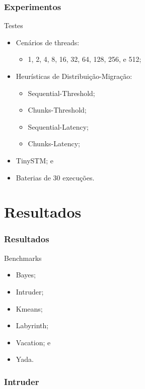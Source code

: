 \documentclass[10pt, pdf,xcolor=pdftex,dvipsnames,table]{beamer}
\begin{document}
\begin{frame} \frametitle{Experimentos}
    \begin{block}{Testes}
        \begin{itemize}
        	\item Cenários de threads: 
            \begin{itemize}
                \item 1, 2, 4, 8, 16, 32, 64, 128, 256, e 512;
            \end{itemize}
            \item Heurísticas de Distribuição-Migração:
            \begin{itemize}
                \item Sequential-Threshold;
                \item Chunks-Threshold;
                \item Sequential-Latency;
                \item Chunks-Latency;
            \end{itemize}
            \item TinySTM; e
            \item Baterias de 30 execuções.
        \end{itemize}
    \end{block}
\end{frame}

\section{Resultados}
\begin{frame} \frametitle{Resultados}
    \begin{block}{Benchmarks}
        \begin{itemize}
        	\item Bayes;
        	\item Intruder;
        	\item Kmeans;
        	\item Labyrinth;
            \item Vacation; e
            \item Yada.
        \end{itemize}
    \end{block}
\end{frame}

\begin{frame} \frametitle{Intruder}
    
\end{frame}
\end{document}
